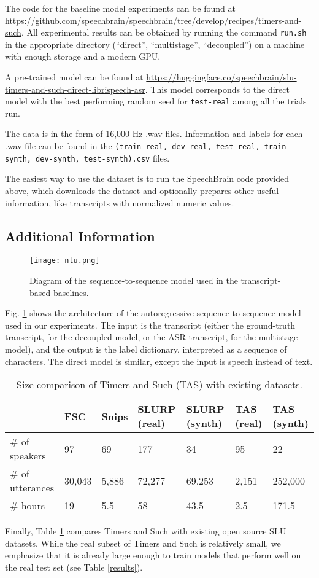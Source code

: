 \documentclass{article}
\begin{document}
The code for the baseline model experiments can be found at \url{https://github.com/speechbrain/speechbrain/tree/develop/recipes/timers-and-such}. All experimental results can be obtained by running the command \texttt{run.sh} in the appropriate directory (``direct'', ``multistage'', ``decoupled'') on a machine with enough storage and a modern GPU.

A pre-trained model can be found at \url{https://huggingface.co/speechbrain/slu-timers-and-such-direct-librispeech-asr}. This model corresponds to the direct model with the best performing random seed for \texttt{test-real} among all the trials run.

The data is in the form of 16,000 Hz .wav files. Information and labels for each .wav file can be found in the \texttt{(train-real, dev-real, test-real, train-synth, dev-synth, test-synth).csv} files.

The easiest way to use the dataset is to run the SpeechBrain code provided above, which downloads the dataset and optionally prepares other useful information, like transcripts with normalized numeric values.


\subsection{Additional Information}

\begin{figure}[h]
    \centering
    \texttt{[image: nlu.png]}
    \caption{Diagram of the sequence-to-sequence model used in the transcript-based baselines.}
    \label{fig:model_diagram}
\end{figure}

Fig. \ref{fig:model_diagram} shows the architecture of the autoregressive sequence-to-sequence model used in our experiments. The input is the transcript (either the ground-truth transcript, for the decoupled model, or the ASR transcript, for the multistage model), and the output is the label dictionary, interpreted as a sequence of characters. The direct model is similar, except the input is speech instead of text.

\begin{table}[h]
  \caption{Size comparison of Timers and Such (TAS) with existing datasets.}
  \centering
  \begin{tabular}{p{20mm}p{10mm} p{10mm}p{10mm}p{10mm}p{10mm}p{10mm}} \toprule
     & FSC & Snips & SLURP (real) & SLURP (synth) & TAS (real) & TAS (synth) \\
    \midrule
    \# of speakers & 97 & 69  & 177 & 34 & 95 & 22 \\ 
    \# of utterances & 30,043 & 5,886 & 72,277 & 69,253 & 2,151 & 252,000 \\
    \# hours  & 19 & 5.5 & 58 & 43.5 & 2.5 & 171.5  \\
    \bottomrule
  \end{tabular}\label{stats-counts-compare}
  
\end{table}

Finally, Table \ref{stats-counts-compare} compares Timers and Such with existing open source SLU datasets. While the real subset of Timers and Such is relatively small, we emphasize that it is already large enough to train models that perform well on the real test set (see Table \ref{results}).
\end{document}
